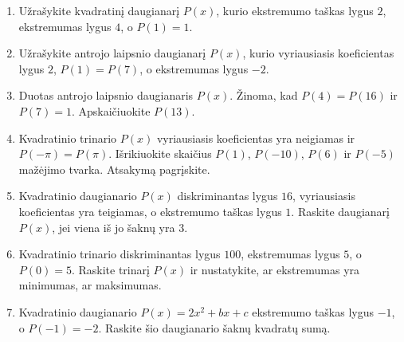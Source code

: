 \documentclass[12pt,a4paper]{article}
\begin{document}
\begin{enumerate}
\item Užrašykite kvadratinį daugianarį $P(x)$, kurio ekstremumo taškas lygus $2$, ekstremumas lygus $4$, o $P(1)=1$.

\item Užrašykite antrojo laipsnio daugianarį $P(x)$, kurio vyriausiasis koeficientas lygus $2$, $P(1)=P(7)$, o ekstremumas lygus $-2$.

\item Duotas antrojo laipsnio daugianaris $P(x)$. Žinoma, kad $P(4)=P(16)$ ir $P(7)=1$. Apskaičiuokite $P(13)$.

\item Kvadratinio trinario $P(x)$ vyriausiasis koeficientas yra neigiamas ir $P(-\pi)=P(\pi)$. Išrikiuokite skaičius $P(1)$, $P(-10)$, $P(6)$ ir $P(-5)$ mažėjimo tvarka. Atsakymą pagrįskite.

\item Kvadratinio daugianario $P(x)$ diskriminantas lygus $16$, vyriausiasis koeficientas yra teigiamas, o ekstremumo taškas lygus $1$. Raskite daugianarį $P(x) $, jei viena iš jo šaknų yra $3$.

\item Kvadratinio trinario diskriminantas lygus $100$, ekstremumas lygus $5$, o $P(0)=5$. Raskite trinarį $P(x)$  ir nustatykite, ar ekstremumas yra minimumas, ar maksimumas.

\item Kvadratinio daugianario $P(x)=2x^2+bx+c$ ekstremumo taškas lygus $-1$, o $P(-1)=-2$. Raskite šio daugianario šaknų kvadratų sumą.
\end{enumerate}
\end{document}
